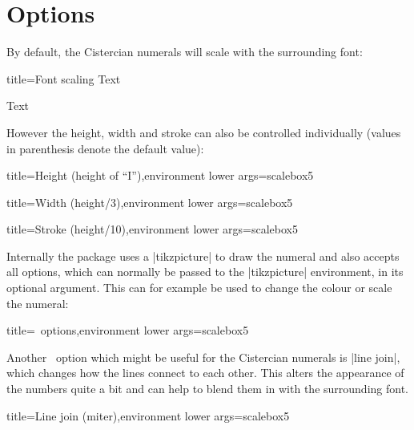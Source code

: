 \documentclass{scrartcl}
\begin{document}
\section{Options}

By default, the Cistercian numerals will scale with the surrounding font:
\begin{tcblisting}{title={Font scaling}}
 Text

\Huge {} Text
\end{tcblisting}

However the height, width and stroke can also be controlled individually (values in parenthesis denote the default value):
\begin{tcblisting}{title={Height (height of ``I'')},environment lower args={scalebox}{5}}
\end{tcblisting}
\begin{tcblisting}{title={Width (height/3)},environment lower args={scalebox}{5}}
\end{tcblisting}
\begin{tcblisting}{title={Stroke (height/10)},environment lower args={scalebox}{5}}
\end{tcblisting}

Internally the package uses a \saminline|tikzpicture| to draw the numeral and also accepts all options, which can normally be passed to the \saminline|tikzpicture| environment, in its optional argument. This can for example be used to change the colour or scale the numeral:
\begin{tcblisting}{title={\TikZ\ options},environment lower args={scalebox}{5}}
\end{tcblisting}

Another \TikZ\ option which might be useful for the Cistercian numerals is \saminline|line join|, which changes how the lines connect to each other. This alters the appearance of the numbers quite a bit and can help to blend them in with the surrounding font.
\begin{tcblisting}{title={Line join (miter)},environment lower args={scalebox}{5}}
\end{tcblisting}

%
\end{document}
